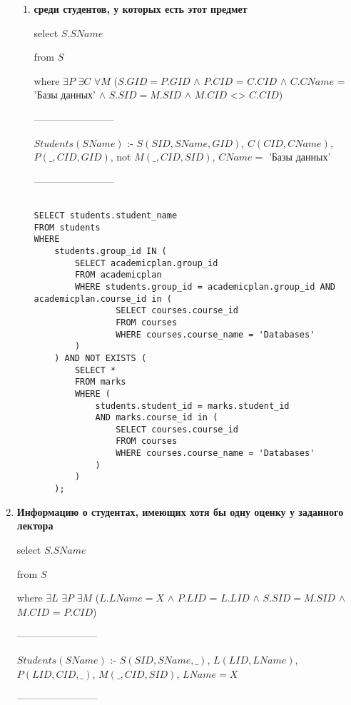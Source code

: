 \documentclass[12pt]{article}
\begin{document}
\begin{enumerate}
\begin{enumerate}
        \item \textbf{среди студентов, у которых есть этот предмет}
        
        	select   $S.SName$  
     		
     		from   $S$   
     		
     		where   $\exists P$ $\exists C$ $\forall M$ ($S.GID = P.GID$ $\wedge$ $P.CID$ = $C.CID$ $\wedge$ $C.CName$ =  'Базы данных' $\wedge$ $S.SID = M.SID$ $\wedge$ $M.CID$ <> $C.CID$)
 
 		------------------------
     		
     		$Students(SName)$ :- $S(SID, SName, GID)$, $C(CID, CName)$, $P(\_, CID, GID)$, not $M(\_, CID, SID)$, $CName = $ 'Базы данных'

		------------------------     		

				\begin{verbatim}

SELECT students.student_name
FROM students 
WHERE 
	students.group_id IN (
		SELECT academicplan.group_id
		FROM academicplan
		WHERE students.group_id = academicplan.group_id AND academicplan.course_id in (
				SELECT courses.course_id 
				FROM courses 
				WHERE courses.course_name = 'Databases'
		)
	) AND NOT EXISTS (
		SELECT * 
		FROM marks 
		WHERE (
			students.student_id = marks.student_id 
			AND marks.course_id in (
				SELECT courses.course_id 
				FROM courses 
				WHERE courses.course_name = 'Databases'
			)
		)
	);

	\end{verbatim}

        \end{enumerate} 
        
    \item \textbf{Информацию о студентах, имеющих хотя бы одну оценку у заданного лектора}

        	select   $S.SName$  
     		
     		from   $S$   
     		
     		where   $\exists L$ $\exists P$ $\exists M$ ($L.LName = X$ $\wedge$ $P.LID$ = $L.LID$ $\wedge$ $S.SID = M.SID$ $\wedge$ $M.CID$ = $P.CID$)
        
		------------------------
     		
     		$Students(SName)$ :- $S(SID, SName, \_)$, $L(LID, LName)$, $P(LID, CID, \_)$, $M(\_, CID, SID)$, $LName = X$

		------------------------     		

    
		\begin{verbatim}


\end{verbatim}
\end{enumerate}
\end{document}

